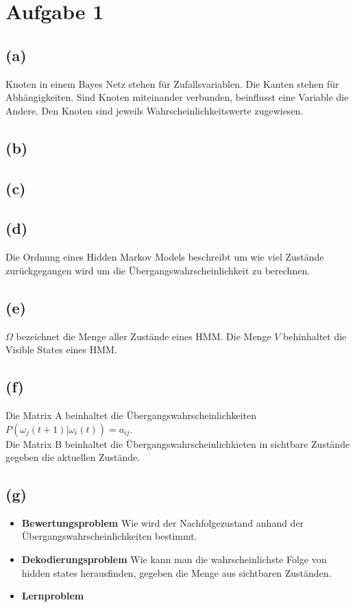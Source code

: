 \documentclass[a4paper]{scrartcl}
\begin{document}
\section*{Aufgabe 1}
\subsection*{(a)}
Knoten in einem Bayes Netz stehen für Zufallsvariablen. Die Kanten stehen für Abhängigkeiten. Sind Knoten miteinander verbunden, beinflusst eine Variable die Andere. Den Knoten sind jeweils Wahrscheinlichkeitswerte zugewiesen.


\subsection*{(b)}



\subsection*{(c)}




\subsection*{(d)}
Die Ordnung eines Hidden Markov Models beschreibt um wie viel Zustände zurückgegangen wird um die Übergangswahrscheinlichkeit zu berechnen. 

\subsection*{(e)}
$\Omega$ bezeichnet die Menge aller Zustände eines HMM.
Die Menge $V$ behinhaltet die Visible States eines HMM.

\subsection*{(f)}
Die Matrix A beinhaltet die Übergangswahrscheinlichkeiten $P(\omega_j(t+1)|\omega_i(t))=a_{ij}$.\\
Die Matrix B beinhaltet die Übergangswahrscheinlichkieten in sichtbare Zustände gegeben die aktuellen Zustände.


\subsection*{(g)}
\begin{itemize}
	\item \textbf{Bewertungsproblem} Wie wird der Nachfolgezustand anhand der Übergangswahrscheinlichkeiten bestimmt. %
	
	\item \textbf{Dekodierungsproblem} Wie kann man die wahrscheinlichste Folge von hidden states herausfinden, gegeben die Menge aus sichtbaren Zuständen.
	
	\item \textbf{Lernproblem}
\end{itemize}
\end{document}
